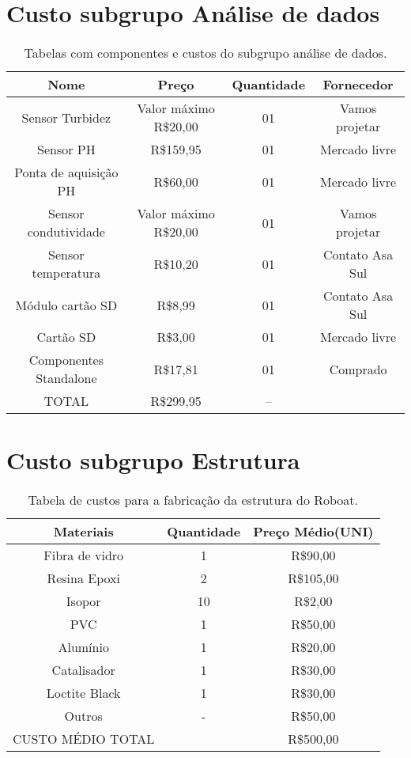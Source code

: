\section{Custo subgrupo Análise de dados}
\begin{table}[h]
	\centering
	\label{Custosubgruposensores}	
	\begin{tabular}{cccc}
		\toprule
		\textbf{Nome} & \textbf{Preço} & \textbf{Quantidade}&\textbf{Fornecedor} \\
		\midrule
		Sensor Turbidez & Valor máximo R\$20,00 & 01   & Vamos projetar       \\
		Sensor PH & R\$159,95 & 01    & Mercado livre         \\
		Ponta de aquisição PH & R\$60,00 & 01    & Mercado livre \\
		Sensor condutividade & Valor máximo R\$20,00 & 01   & Vamos projetar          \\
		Sensor temperatura & R\$10,20 & 01 & Contato Asa Sul            \\
		Módulo cartão SD & R\$8,99 & 01   & Contato Asa Sul          \\
		Cartão SD & R\$3,00 & 01  & Mercado livre           \\
		Componentes Standalone & R\$17,81 & 01   & Comprado          \\
		TOTAL & R\$299,95 &--            \\
		\bottomrule
	\end{tabular}	
	\caption{Tabelas com componentes e custos do subgrupo análise de dados.}
\end{table}
\section{Custo subgrupo Estrutura}
\begin{table}[h]
	\centering
	\label{custoestrutura}	
	\begin{tabular}{ccc}
		\toprule
		\textbf{Materiais} & \textbf{Quantidade} & \textbf{Preço Médio(UNI)} \\
		\midrule
		Fibra de vidro & 1 & R\$90,00 
          \\
		Resina Epoxi & 2 & R\$105,00            \\
		Isopor &10 & R\$2,00               \\
		PVC  & 1 & R\$50,00  \\
		Alumínio & 1& R\$20,00                      \\
		Catalisador & 1 & R\$30,00             \\
		Loctite Black &1 & R\$30,00            \\
		Outros  & - & R\$50,00           \\
		CUSTO MÉDIO TOTAL & & R\$500,00           \\	
		\bottomrule
	\end{tabular}	
	\caption{Tabela de custos para a fabricação da estrutura do Roboat.}
\end{table}


